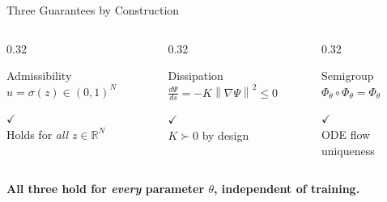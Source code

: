 \documentclass[aspectratio=169, 11pt]{beamer}
\newcommand{\PhiT}{\Phi_{\theta}}
\newcommand{\R}{\mathbb{R}}
\newcommand{\norm}[1]{\left\lVert #1 \right\rVert}
\begin{document}
\begin{frame}{Three Guarantees by Construction}

\begin{columns}[T]
\begin{column}{0.32\textwidth}
\begin{alertblock}{Admissibility}
$u = \sigma(z) \in (0,1)^N$

\vspace{0.15cm}
\centering
\Large $\checkmark$\\[2pt]
\normalsize Holds for \emph{all} $z \in \R^N$
\end{alertblock}
\end{column}

\begin{column}{0.32\textwidth}
\begin{alertblock}{Dissipation}
$\frac{d\Psi}{ds} = -K\norm{\nabla\Psi}^2 \leq 0$

\vspace{0.15cm}
\centering
\Large $\checkmark$\\[2pt]
\normalsize $K \succ 0$ by design
\end{alertblock}
\end{column}

\begin{column}{0.32\textwidth}
\begin{alertblock}{Semigroup}
$\PhiT \circ \PhiT = \PhiT$

\vspace{0.15cm}
\centering
\Large $\checkmark$\\[2pt]
\normalsize ODE flow uniqueness
\end{alertblock}
\end{column}
\end{columns}

\vspace{0.4cm}
\centering
\textbf{All three hold for \emph{every} parameter $\theta$, independent of training.}
\end{frame}
\end{document}
